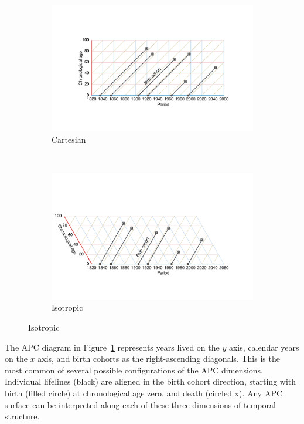 \documentclass[12pt,oneside,a4paper]{article} %
\begin{document}
\begin{figure}[h!] 
\caption{An APC diagram in two projections.}
\label{fig:APC}
\centering
\begin{subfigure}{1.1\textwidth}
\caption{Cartesian}
\vspace{-5em}
\label{fig:APCrt}
\includegraphics[scale=0.8]{Figures/APCrt.pdf}
\end{subfigure}
\\\vspace{-2em}
\begin{subfigure}{1.1\textwidth}
\caption{Isotropic}
\vspace{-6em}
\label{fig:APCeq}
\includegraphics[scale=0.8]{Figures/APCeq.pdf}
\end{subfigure}
\end{figure}

The APC diagram in Figure~\ref{fig:APCrt} represents years lived on the $y$
axis, calendar years on the $x$ axis, and birth cohorts as the right-ascending
diagonals. This is the most common of several possible configurations
of the APC dimensions. Individual lifelines (black) are aligned in the birth
cohort direction, starting with birth (filled circle) at chronological age zero, and death
(circled x). Any APC surface can be interpreted along each of these
three dimensions of temporal structure. 
\end{document}

